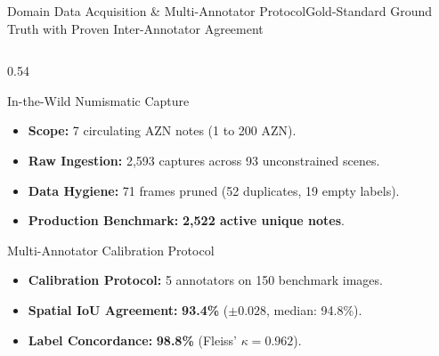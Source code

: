 
\begin{frame}{Domain Data Acquisition \& Multi-Annotator Protocol}{Gold-Standard Ground Truth with Proven Inter-Annotator Agreement}
    \begin{columns}[c]
        \begin{column}{0.54\textwidth}
            \begin{techblock}{In-the-Wild Numismatic Capture}
                \footnotesize
                \begin{itemize}\setlength{\itemsep}{2pt}
                    \item \textbf{Scope:} 7 circulating AZN notes (1 to 200 AZN).
                    \item \textbf{Raw Ingestion:} 2,593 captures across 93 unconstrained scenes.
                    \item \textbf{Data Hygiene:} 71 frames pruned (52 duplicates, 19 empty labels).
                    \item \textbf{Production Benchmark:} \textbf{2,522 active unique notes}.
                \end{itemize}
            \end{techblock}
            
            \vspace{0.12cm}
            \begin{alertblockcustom}{Multi-Annotator Calibration Protocol}
                \footnotesize
                \begin{itemize}\setlength{\itemsep}{2pt}
                    \item \textbf{Calibration Protocol:} 5 annotators on 150 benchmark images.
                    \item \textbf{Spatial IoU Agreement:} \textbf{93.4\%} ($\pm 0.028$, median: 94.8\%).
                    \item \textbf{Label Concordance:} \textbf{98.8\%} (Fleiss' $\kappa = 0.962$).
                \end{itemize}
            \end{alertblockcustom}
        \end{column}
        

\end{columns}
\end{frame}
